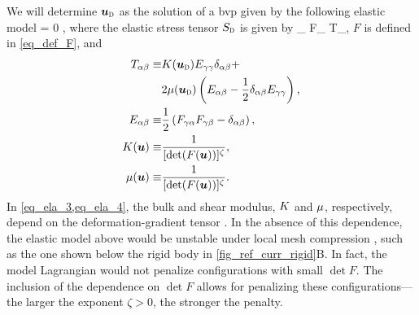 We will determine $\budom$ as the solution of a \ac{bvp} given by the following elastic model \cite{kamenskyLectureNotesMAE,marsdenMathematicalFoundationsElasticity1994}
\be\label{eq_mesh_fluid_rigid}
\pder{\Sdom_{\alpha \beta}(\budom)}{\xr[\beta]} = 0  \omr,
\ee
where the elastic stress tensor $\Sdom$ is given by
\be
\label{eq_def_S}
\Sdom_{\alpha \beta} \equiv F_{\alpha \gamma} T_{\gamma \beta},
\ee
$F$ is defined in \cref{eq_def_F}, and
\begin{align}
    \label{eq_ela_1}
    T_{\alpha \beta}  \equiv & \kel(\budom) E_{\gamma \gamma} \delta_{\alpha \beta} +\newlinenn
                             & 2 \muel(\budom) \left(E_{\alpha \beta} - \frac{1}{2} \delta_{\alpha \beta} E_{\gamma \gamma}\right), \\
    \label{eq_ela_2}
    E_{\alpha \beta}  \equiv & \frac{1}{2}\left( F_{\gamma \alpha}F_{\gamma \beta} - \delta_{\alpha \beta}\right),                  \\
    \label{eq_ela_3}
    \kel(\bu)         \equiv & \frac{1}{[\det(F(\bu))]^\zeta},                                                                      \\
    \label{eq_ela_4}
    \muel(\bu)        \equiv & \frac{1}{[\det(F(\bu))]^\zeta}.
\end{align}
In \cref{eq_ela_3,eq_ela_4}, the bulk and shear modulus, $K$ and $\mu$, respectively, depend on the deformation-gradient tensor . In the absence of this dependence, the elastic model above would be unstable under local mesh compression \cite{kamenskyLectureNotesMAE}, such as the one shown below the rigid body in \cref{fig_ref_curr_rigid}B. In fact, the model Lagrangian would not penalize configurations with  small $\det F$. The inclusion of the dependence  on $\det F$  allows for penalizing these configurations---the larger the exponent $\zeta > 0$, the stronger the penalty.




